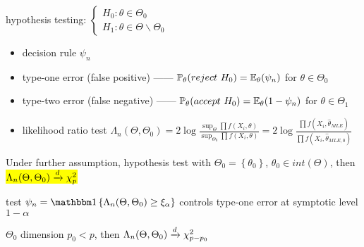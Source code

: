 \begin{setting}
    hypothesis testing: $\begin{cases}
                            H_0:\theta \in \Theta_0 \\
                            H_1:\theta \in \Theta \backslash \Theta_0
    \end{cases}$
\end{setting}

\begin{itemize}
    \item decision rule $\psi_n$
    \item type-one error (false positive) ------ $\mathbb{P}_\theta(reject\,\, H_0) = \mathbb{E}_\theta(\psi_n)$ for $\theta \in \Theta_0$
    \item type-two error (false negative) ------ $\mathbb{P}_\theta(accept \,\, H_0) = \mathbb{E}_\theta(1 - \psi_n)$ for $\theta \in \Theta_1$
    \item likelihood ratio test $\Lambda_n(\Theta, \Theta_0) = 2\log \frac{\sup_\Theta \prod f(X_i, \theta)}{\sup_{\Theta_0} \prod f(X_i, \theta)}= 2\log \frac{\prod f(X_i, \hat \theta_{MLE})}{\prod f(X_i, \hat \theta_{MLE, 0})}$
\end{itemize}

\begin{thm}
    Under further assumption, hypothesis test with $\Theta_0 = \left\{ \theta_0 \right\}$, $\theta_0 \in int(\Theta)$, then
    \hl{$\Lambda_n(\Theta, \Theta_0) \xrightarrow{d} \chi^2_p$}
\end{thm}

\begin{fact}
    test $\psi_n = \In \left\{ \Lambda_n(\Theta, \Theta_0) \geq \xi_\alpha \right\}$ controls type-one error at symptotic level $1 - \alpha$
\end{fact}

\begin{fact}
    $\Theta_0$ dimension $p_0 < p$, then $\Lambda_n(\Theta, \Theta_0) \xrightarrow{d} \chi^2_{p - p_0}$
\end{fact}

